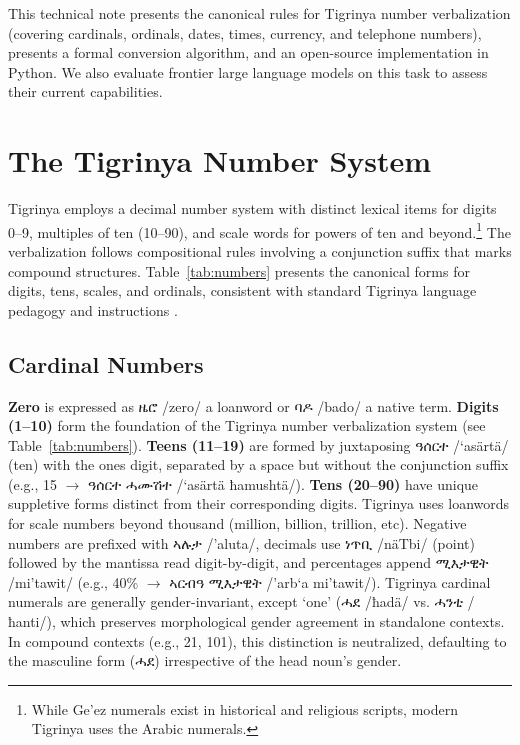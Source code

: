 \documentclass{article}
\newcommand{\ti}[1]{{\geezfont #1}}
\newcommand{\tiipa}[2]{{\geezfont #1} /#2/}
\begin{document}
This technical note presents the canonical rules for Tigrinya number verbalization (covering cardinals, ordinals, dates, times, currency, and telephone numbers), presents a formal conversion algorithm, and an open-source implementation in Python. We also evaluate frontier large language models on this task to assess their current capabilities.

\section{The Tigrinya Number System}

Tigrinya employs a decimal number system with distinct lexical items for digits 0--9, multiples of ten (10--90), and scale words for powers of ten and beyond.\footnote{While Ge'ez numerals exist in historical and religious scripts, modern Tigrinya uses the Arabic numerals.} The verbalization follows compositional rules involving a conjunction suffix that marks compound structures. Table~\ref{tab:numbers} presents the canonical forms for digits, tens, scales, and ordinals, consistent with standard Tigrinya language pedagogy and instructions \citep{tesfamariam-2018-lets-speak-tigrinya}.

\subsection{Cardinal Numbers}
\label{sec:cardinals}

\textbf{Zero} is expressed as \tiipa{ዜሮ}{zero} a loanword or \tiipa{ባዶ}{bado} a native term. \textbf{Digits (1--10)} form the foundation of the Tigrinya number verbalization system (see Table~\ref{tab:numbers}). \textbf{Teens (11--19)} are formed by juxtaposing \tiipa{ዓሰርተ}{`asärtä} (ten) with the ones digit, separated by a space but without the conjunction suffix (e.g., 15 $\rightarrow$ \tiipa{ዓሰርተ ሓሙሽተ}{`asärtä ħamushtä}). \textbf{Tens (20--90)} have unique suppletive forms distinct from their corresponding digits.
Tigrinya uses loanwords for scale numbers beyond thousand (million, billion, trillion, etc). Negative numbers are prefixed with \tiipa{ኣሉታ}{'aluta}, decimals use \tiipa{ነጥቢ}{näTbi} (point) followed by the mantissa read digit-by-digit, and percentages append \tiipa{ሚእታዊት}{mi'tawit} (e.g., 40\% $\rightarrow$ \tiipa{ኣርብዓ ሚእታዊት}{'arb`a mi'tawit}).
Tigrinya cardinal numerals are generally gender-invariant, except `one' (\tiipa{ሓደ}{ħadä} vs. \tiipa{ሓንቲ}{ħanti}), which preserves morphological gender agreement in standalone contexts. In compound contexts (e.g., 21, 101), this distinction is neutralized, defaulting to the masculine form (\ti{ሓደ}) irrespective of the head noun's gender.
\end{document}
